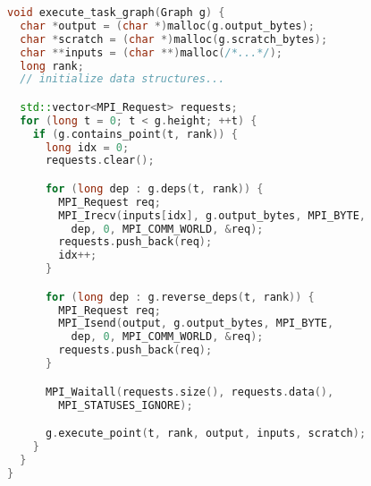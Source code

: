 \begin{lstlisting}[language=C++,caption={Excerpt from Task Bench implementation in MPI.},label={lst:code-sample},style=codeblock,float]
void execute_task_graph(Graph g) {
  char *output = (char *)malloc(g.output_bytes);
  char *scratch = (char *)malloc(g.scratch_bytes);
  char **inputs = (char **)malloc(/*...*/);
  long rank;
  // initialize data structures...

  std::vector<MPI_Request> requests;
  for (long t = 0; t < g.height; ++t) {
    if (g.contains_point(t, rank)) {
      long idx = 0;
      requests.clear();

      for (long dep : g.deps(t, rank)) {
        MPI_Request req;
        MPI_Irecv(inputs[idx], g.output_bytes, MPI_BYTE,
          dep, 0, MPI_COMM_WORLD, &req);
        requests.push_back(req);
        idx++;
      }

      for (long dep : g.reverse_deps(t, rank)) {
        MPI_Request req;
        MPI_Isend(output, g.output_bytes, MPI_BYTE,
          dep, 0, MPI_COMM_WORLD, &req);
        requests.push_back(req);
      }

      MPI_Waitall(requests.size(), requests.data(),
        MPI_STATUSES_IGNORE);

      g.execute_point(t, rank, output, inputs, scratch);
    }
  }
}
\end{lstlisting}
